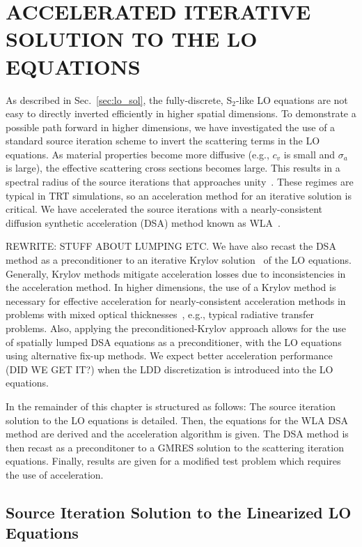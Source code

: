 
\chapter{\uppercase {Accelerated Iterative Solution to the LO Equations}}

As described in Sec.~\ref{sec:lo_sol}, the fully-discrete, S$_2$-like LO equations
are not easy to directly inverted efficiently in higher spatial dimensions.  
To demonstrate a possible path forward in
higher dimensions, we have investigated the use of a standard
source iteration scheme to invert the scattering terms in the LO equations.  As
material properties become more diffusive (e.g., $c_v$ is small and $\sigma_a$ is
large), the effective scattering cross sections becomes large.  This results in a spectral radius of the source iterations that approaches
unity~\cite{morel_ldtrt}.  These regimes are typical in TRT simulations, so an
acceleration method for an iterative solution is critical. 
We have accelerated the source iterations with a nearly-consistent diffusion synthetic acceleration
(DSA) method known as WLA~\cite{wla,wla_thesis}.

REWRITE: STUFF ABOUT LUMPING ETC.
We have also recast the DSA method as a preconditioner to an iterative
Krylov solution~\cite{larson_morel_sn} of the LO equations.  Generally, Krylov
methods mitigate acceleration losses due to inconsistencies in the acceleration
method.  In higher dimensions, the use of a Krylov method is necessary for effective
acceleration for nearly-consistent acceleration methods in problems with
mixed optical thicknesses~\cite{larson_morel_sn}, e.g., typical radiative transfer
problems.  Also, applying the preconditioned-Krylov approach allows for the use of
spatially lumped DSA  equations as a preconditioner, with the LO equations using
alternative fix-up methods.  We expect better acceleration performance (DID WE GET IT?) when the
LDD discretization is introduced into the LO equations. 

In the remainder of this chapter is structured as follows:  The source
iteration solution to the LO equations is detailed.  Then, the equations for the WLA DSA
method are derived and the acceleration algorithm is given.  The DSA method is then recast
as a preconditoner to a GMRES solution to the scattering iteration equations.  Finally,
results are given for a modified test problem which requires the use of acceleration.

\section{Source Iteration Solution to the Linearized LO Equations}
\label{sec:si}

